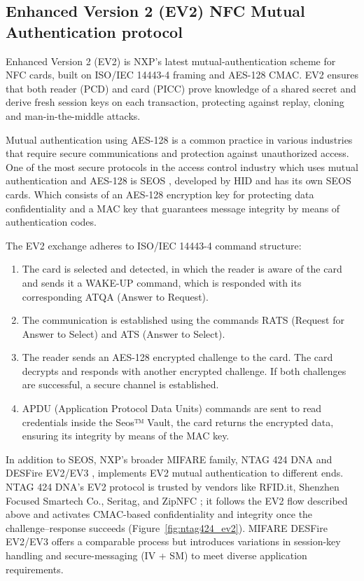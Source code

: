 \subsection{Enhanced Version 2 (EV2) NFC Mutual Authentication protocol}
\label{subsec:EV2}

Enhanced Version 2 (EV2) \cite{ref29} is NXP’s latest mutual-authentication scheme for NFC cards, built on ISO/IEC 14443-4 framing and AES-128 CMAC. EV2 ensures that both reader (PCD) and card (PICC) prove knowledge of a shared secret and derive fresh session keys on each transaction, protecting against replay, cloning and man-in-the-middle attacks.

Mutual authentication using AES-128 is a common practice in various industries that require secure communications and protection against unauthorized access. One of the most secure protocols in the access control industry which uses mutual authentication and AES-128 is SEOS \cite{ref31}, developed by HID and has its own SEOS cards. Which consists of an AES-128 encryption key for protecting data confidentiality and a MAC key that guarantees message integrity by means of authentication codes.

The EV2 exchange adheres to ISO/IEC 14443-4 command structure:
\begin{enumerate}
	\item The card is selected and detected, in which the reader is aware of the card and sends it a WAKE-UP command, which is responded with its corresponding ATQA (Answer to Request).
	\item The communication is established using the commands RATS (Request for Answer to Select) and ATS (Answer to Select).
	\item The reader sends an AES-128 encrypted challenge to the card. The card decrypts and responds with another encrypted challenge. If both challenges are successful, a secure channel is established.
	\item APDU (Application Protocol Data Units) commands are sent to read credentials inside the Seos™ Vault, the card returns the encrypted data, ensuring its integrity by means of the MAC key.
\end{enumerate}

In addition to SEOS, NXP’s broader MIFARE family, NTAG 424 DNA and DESFire EV2/EV3 \cite{ref32}, implements EV2 mutual authentication to different ends. NTAG 424 DNA’s EV2 protocol is trusted by vendors like RFID.it, Shenzhen Focused Smartech Co., Seritag, and ZipNFC \cite{ref84}; it follows the EV2 flow described above and activates CMAC-based confidentiality and integrity once the challenge–response succeeds (Figure~\ref{fig:ntag424_ev2}). MIFARE DESFire EV2/EV3 offers a comparable process but introduces variations in session-key handling and secure-messaging (IV + SM) to meet diverse application requirements.

